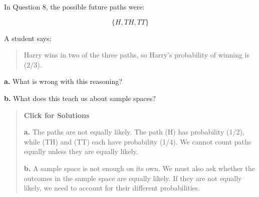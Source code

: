 \documentclass[
  letterpaper,
  DIV=11,
  numbers=noendperiod]{scrreprt}
\begin{document}
\begin{tcolorbox}[enhanced jigsaw, arc=.35mm, bottomrule=.15mm, bottomtitle=1mm, breakable, colback=white, colbacktitle=quarto-callout-note-color!10!white, colframe=quarto-callout-note-color-frame, coltitle=black, left=2mm, leftrule=.75mm, opacityback=0, opacitybacktitle=0.6, rightrule=.15mm, title=\textcolor{quarto-callout-note-color}{\faInfo}\hspace{0.5em}{Question 9}, titlerule=0mm, toprule=.15mm, toptitle=1mm]

In Question 8, the possible future paths were:

\[
\{H,TH,TT\}
\]

A student says:

\begin{quote}
Harry wins in two of the three paths, so Harry's probability of winning
is (2/3).
\end{quote}

\textbf{a.} What is wrong with this reasoning?

\textbf{b.} What does this teach us about sample spaces?

\begin{quote}
\textbf{Click for Solutions}

\textbf{a.} The paths are not equally likely. The path (H) has
probability (1/2), while (TH) and (TT) each have probability (1/4). We
cannot count paths equally unless they are equally likely.

\textbf{b.} A sample space is not enough on its own. We must also ask
whether the outcomes in the sample space are equally likely. If they are
not equally likely, we need to account for their different
probabilities.
\end{quote}

\end{tcolorbox}
\end{document}
